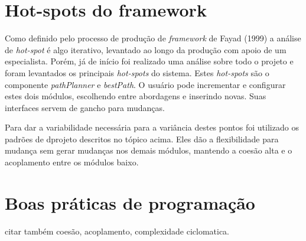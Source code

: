 \section{Hot-spots do framework}

Como definido pelo processo de produção de \textit{framework} de Fayad (1999) a análise de \textit{hot-spot} é algo iterativo, levantado ao longo da produção com apoio de um especialista. Porém, já de início foi realizado uma análise sobre todo o projeto e foram levantados os principais \textit{hot-spots} do sistema. Estes \textit{hot-spots} são o componente \textit{pathPlanner} e \textit{bestPath}. O usuário pode incrementar e configurar estes dois módulos, escolhendo entre abordagens e inserindo novas. Suas interfaces servem de gancho para mudanças.

Para dar a variabilidade necessária para a variância destes pontos foi utilizado os padrões de dprojeto descritos no tópico acima. Eles dão a flexibilidade para mudança sem gerar mudanças nos demais módulos, mantendo a coesão alta e o acoplamento entre os módulos baixo.

\section{Boas práticas de programação}
citar também coesão, acoplamento, complexidade ciclomatica.